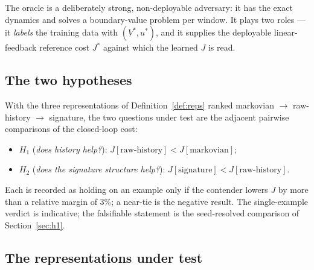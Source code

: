 \documentclass[11pt]{article}
\renewcommand{\_}{\discretionary{\textunderscore}{}{\textunderscore}}
\theoremstyle{plain}
\theoremstyle{definition}
\begin{document}
The oracle is a deliberately strong, non-deployable adversary: it has the exact dynamics and
solves a boundary-value problem per window. It plays two roles --- it \emph{labels} the
training data with $(V^{\ast},u^{\ast})$, and it supplies the deployable linear-feedback
reference cost $J^{\ast}$ against which the learned $J$ is read.

\subsection{The two hypotheses}

With the three representations of Definition~\ref{def:reps} ranked markovian $\to$ raw-history
$\to$ signature, the two questions under test are the adjacent pairwise comparisons of the
closed-loop cost:
\begin{itemize}
\item $H_1$ (\emph{does history help?}): $J[\text{raw-history}]<J[\text{markovian}]$;
\item $H_2$ (\emph{does the signature structure help?}): $J[\text{signature}]<J[\text{raw-history}]$.
\end{itemize}
Each is recorded as holding on an example only if the contender lowers $J$ by more than a relative
margin of $3\%$; a near-tie is the negative result. The single-example verdict is indicative; the
falsifiable statement is the seed-resolved comparison of Section~\ref{sec:h1}.

\subsection{The representations under test}
\end{document}

